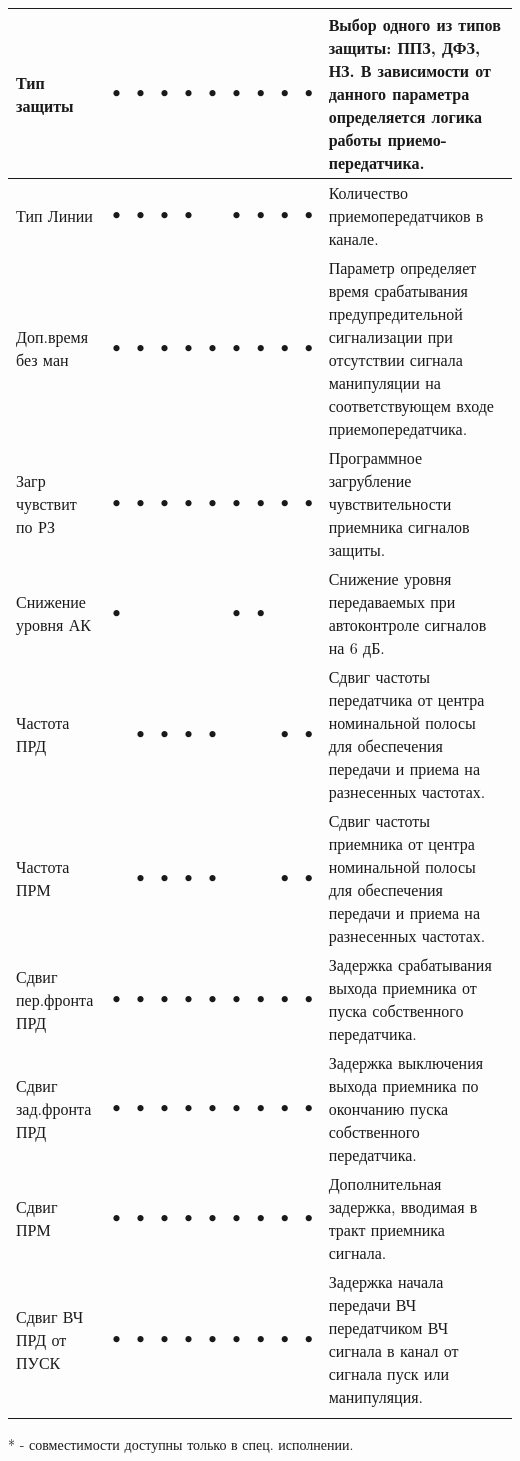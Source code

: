 \begin{tabularx}{\linewidth}{| M{4.6cm} |*{9}{p{0.3cm} |} m{5.8cm} |}
	Тип защиты 			& $\bullet$ & $\bullet$ & $\bullet$ & $\bullet$ & $\bullet$ & $\bullet$ & $\bullet$ & $\bullet$ & $\bullet$ & Выбор одного из типов защиты: ППЗ, ДФЗ, НЗ. В зависимости от данного параметра определяется логика работы приемо-передатчика. \tabularnewline \hline
	Тип Линии			& $\bullet$ & $\bullet$ & $\bullet$ & $\bullet$ &   & $\bullet$ & $\bullet$ & $\bullet$ & $\bullet$ & Количество приемопередатчиков в канале. \tabularnewline \hline
	Доп.время без ман	& $\bullet$ & $\bullet$ & $\bullet$ & $\bullet$ & $\bullet$ & $\bullet$ & $\bullet$ & $\bullet$ & $\bullet$ & Параметр определяет время срабатывания предупредительной сигнализации при отсутствии сигнала манипуляции на соответствующем входе приемопередатчика. \tabularnewline \hline
	Загр чувствит по РЗ & $\bullet$ & $\bullet$ & $\bullet$ & $\bullet$ & $\bullet$ & $\bullet$ & $\bullet$ & $\bullet$ & $\bullet$ & Программное загрубление чувствительности приемника сигналов защиты. \tabularnewline \hline
	Снижение уровня АК  & $\bullet$ &   &   &   &   & $\bullet$ & $\bullet$ &   &   & Снижение уровня передаваемых при автоконтроле сигналов на 6 дБ. \tabularnewline \hline
	Частота ПРД			&   & $\bullet$ & $\bullet$ & $\bullet$ & $\bullet$ &   &   & $\bullet$ & $\bullet$ & Сдвиг частоты передатчика от центра номинальной полосы для обеспечения передачи и приема на разнесенных частотах. \tabularnewline \hline
	Частота ПРМ			&   & $\bullet$ & $\bullet$ & $\bullet$ & $\bullet$ &   &   & $\bullet$ & $\bullet$ & Сдвиг частоты приемника от центра номинальной полосы для обеспечения передачи и приема на разнесенных частотах. \tabularnewline \hline
	Сдвиг пер.фронта ПРД & $\bullet$ & $\bullet$ & $\bullet$ & $\bullet$ & $\bullet$ & $\bullet$ & $\bullet$ & $\bullet$ & $\bullet$ & Задержка срабатывания выхода приемника от пуска собственного передатчика. \tabularnewline \hline
	Сдвиг зад.фронта ПРД & $\bullet$ & $\bullet$ & $\bullet$ & $\bullet$ & $\bullet$ & $\bullet$ & $\bullet$ & $\bullet$ & $\bullet$ & Задержка выключения выхода приемника по окончанию пуска собственного передатчика. \tabularnewline \hline
	Сдвиг ПРМ			& $\bullet$ & $\bullet$ & $\bullet$ & $\bullet$ & $\bullet$ & $\bullet$ & $\bullet$ & $\bullet$ & $\bullet$ & Дополнительная задержка, вводимая в тракт приемника сигнала. \tabularnewline \hline		
	Сдвиг ВЧ ПРД от ПУСК & $\bullet$ & $\bullet$ & $\bullet$ & $\bullet$ & $\bullet$ & $\bullet$ & $\bullet$ & $\bullet$ & $\bullet$ & Задержка начала передачи ВЧ передатчиком ВЧ сигнала в канал от сигнала пуск или манипуляция. \tabularnewline 

    \lasthline
\end{tabularx}

* - совместимости доступны только в спец. исполнении.
